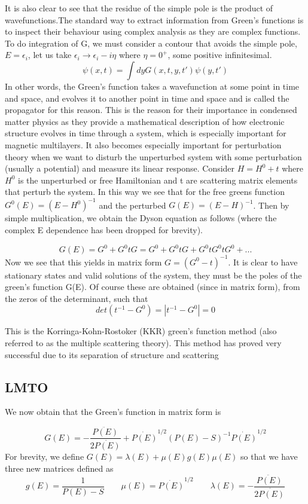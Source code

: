 \documentclass{article}
\begin{document}
It is also clear to see that the residue of the simple pole is the product of wavefunctions.The standard way to extract information from Green's functions is to inspect their behaviour using complex analysis as they are complex functions. To do integration of G, we must consider a contour that avoids the simple pole, $E=\epsilon_i$, let us take $\epsilon_i \rightarrow \epsilon_i-i\eta$ where $\eta=0^+$, some positive infinitesimal.
$$\psi(x,t)=\int dy G(x,t,y,t')\psi(y,t')$$
In other words, the Green's function takes a wavefunction at some point in time and space, and evolves it to another point in time and space and is called the propagator for this reason. This is the reason for their importance in condensed matter physics as they provide a mathematical description of how electronic structure evolves in time through a system, which is especially important for magnetic multilayers. It also becomes especially important for perturbation theory when we want to disturb the unperturbed system with some perturbation (usually a potential) and measure its linear response. Consider $H=H^0+t$ where $H^0$ is the unperturbed or free Hamiltonian and t are scattering matrix elements that perturb the system. In this way we see that for the free greens function $G^0(E)=(E-H^0)^{-1}$ and the perturbed $G(E)=(E-H)^{-1}$. Then by simple multiplication, we obtain the Dyson equation as follows (where the complex E dependence has been dropped for brevity).

$$G(E)=G^0+G^0tG=G^0+G^0tG+G^0tG^0tG^0+...$$
Now we see that this yields in matrix form $G=(G^0-t)^{-1}$. It is clear to have stationary states and valid solutions of the system, they must be the poles of the green's function G(E). Of course these are obtained (since in matrix form), from the zeros of the determinant, such that
$$det(t^{-1}-G^0)=|t^{-1}-G^0|=0$$

This is the Korringa-Kohn-Rostoker (KKR) green's function method (also referred to as the multiple scattering theory). This method has proved very successful due to its separation of structure and scattering

\subsection{LMTO}
We now obtain that the Green's function in matrix form is

$$ G(E) = - \frac{\ddot{P(E)}}{2\dot{P(E)}} + \dot{P(E)}^{1/2} (P(E)-S)^{-1} \dot{P(E)}^{1/2}$$
For brevity, we define $G(E)= \lambda(E) +\mu(E)g(E)\mu(E)$ so that we have three new matrices defined as
$$g(E)=\frac{1}{P(E)-S} \qquad \mu(E)= \dot{P(E)}^{1/2} \qquad \lambda(E)=- \frac{\ddot{P(E)}}{2\dot{P(E)}}$$
\end{document}
